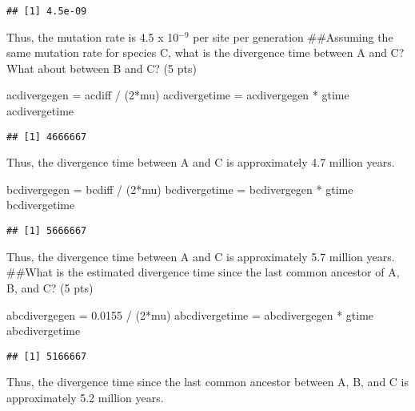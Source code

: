 \documentclass[]{article}
\newenvironment{Shaded}{\begin{snugshade}}{\end{snugshade}}
\newcommand{\DecValTok}[1]{\textcolor[rgb]{0.00,0.00,0.81}{{#1}}}
\newcommand{\FloatTok}[1]{\textcolor[rgb]{0.00,0.00,0.81}{{#1}}}
\newcommand{\StringTok}[1]{\textcolor[rgb]{0.31,0.60,0.02}{{#1}}}
\newcommand{\NormalTok}[1]{{#1}}
\begin{document}
\begin{verbatim}
## [1] 4.5e-09
\end{verbatim}

Thus, the mutation rate is 4.5 x 10$^{-9}$ per site per generation
\#\#Assuming the same mutation rate for species C, what is the
divergence time between A and C? What about between B and C? (5 pts)

\begin{Shaded}
\begin{Highlighting}[]
\NormalTok{acdivergegen =}\StringTok{ }\NormalTok{acdiff /}\StringTok{ }\NormalTok{(}\DecValTok{2}\NormalTok{*mu)}
\NormalTok{acdivergetime =}\StringTok{ }\NormalTok{acdivergegen *}\StringTok{ }\NormalTok{gtime}
\NormalTok{acdivergetime}
\end{Highlighting}
\end{Shaded}

\begin{verbatim}
## [1] 4666667
\end{verbatim}

Thus, the divergence time between A and C is approximately 4.7 million
years.

\begin{Shaded}
\begin{Highlighting}[]
\NormalTok{bcdivergegen =}\StringTok{ }\NormalTok{bcdiff /}\StringTok{ }\NormalTok{(}\DecValTok{2}\NormalTok{*mu)}
\NormalTok{bcdivergetime =}\StringTok{ }\NormalTok{bcdivergegen *}\StringTok{ }\NormalTok{gtime}
\NormalTok{bcdivergetime}
\end{Highlighting}
\end{Shaded}

\begin{verbatim}
## [1] 5666667
\end{verbatim}

Thus, the divergence time between A and C is approximately 5.7 million
years. \#\#What is the estimated divergence time since the last common
ancestor of A, B, and C? (5 pts)

\begin{Shaded}
\begin{Highlighting}[]
\NormalTok{abcdivergegen =}\StringTok{ }\FloatTok{0.0155} \NormalTok{/}\StringTok{ }\NormalTok{(}\DecValTok{2}\NormalTok{*mu)}
\NormalTok{abcdivergetime =}\StringTok{ }\NormalTok{abcdivergegen *}\StringTok{ }\NormalTok{gtime}
\NormalTok{abcdivergetime}
\end{Highlighting}
\end{Shaded}

\begin{verbatim}
## [1] 5166667
\end{verbatim}

Thus, the divergence time since the last common ancestor between A, B,
and C is approximately 5.2 million years.
\end{document}
